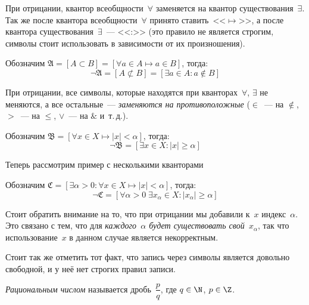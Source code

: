 \begin{example}
При отрицании, квантор всеобщности~\(\forall\) заменяется на квантор существования~\(\exists\). Так
же после квантора всеобщности~\(\forall\) принято ставить~<<\(\mapsto\)>>, а после квантора
существования~\(\exists\)~--- <<:>> (это правило не является строгим, символы стоит использовать в
зависимости от их произношения).

Обозначим \(\mathfrak{A} = \left[A \subset B\right] = \left[\forall a \in A \mapsto a \in B
\right]\), тогда:
\[
    \neg \mathfrak{A} = \left[A \not\subset B\right] =
    \left[\exists a \in A: a \notin B\right]
\]
\end{example}

\begin{example}
При отрицании, все символы, которые находятся при кванторах~\(\forall\), \(\exists\) не меняются,
а все остальные~--- \textit{заменяются на противоположные} (\(\in\)~--- на \(\notin\), \(>\)~--- на
\(\leq\), \(\lor\)~--- на \(\&\) и~т.\,д.).

Обозначим \(\mathfrak{B} = \left[\forall x \in X \mapsto \lvert x \rvert < \alpha \right]\), тогда:
\[
    \neg \mathfrak{B} = \left[\exists x \in X: \lvert x \rvert \ge \alpha\right]
\]
\end{example}

\begin{example}
Теперь рассмотрим пример с несколькими кванторами

Обозначим \(\mathfrak{C} = \left[\exists \alpha > 0: \forall x \in X \mapsto \lvert x \rvert <
\alpha\right]\), тогда:
\[
    \neg \mathfrak{C} = \left[ \forall \alpha > 0 \; \exists x_\alpha \in X: \lvert x_\alpha \rvert
        \geq \alpha\right]
\]

Стоит обратить внимание на то, что при отрицании мы добавили к~\(x\) индекс~\(\alpha\). Это связано
с тем, что для \textit{каждого~\(\alpha\) будет существовать свой~\(x_{\alpha}\)}, так что
использование~\(x\) в данном случае является некорректным.
\end{example}

Стоит так же отметить тот факт, что запись через символы является довольно свободной, и у неё нет
строгих правил записи.



\begin{definition}
\textit{Рациональным числом} называется дробь~\(\dfrac{p}{q}\), где \(q \in \N\), \(p \in \Z\).
\end{definition}

